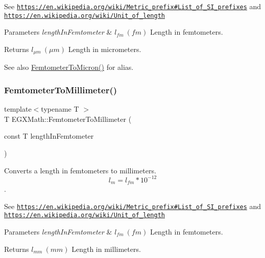 See \href{https://en.wikipedia.org/wiki/Metric_prefix#List_of_SI_prefixes}{\tt https\+://en.\+wikipedia.\+org/wiki/\+Metric\+\_\+prefix\#\+List\+\_\+of\+\_\+\+S\+I\+\_\+prefixes} and \href{https://en.wikipedia.org/wiki/Unit_of_length}{\tt https\+://en.\+wikipedia.\+org/wiki/\+Unit\+\_\+of\+\_\+length} 
\begin{DoxyParams}{Parameters}
{\em length\+In\+Femtometer} & $ l_{fm}\ (fm)$ Length in femtometers. \\
\hline
\end{DoxyParams}
\begin{DoxyReturn}{Returns}
$ l_{\mu m}\ (\mu m)$ Length in micrometers. 
\end{DoxyReturn}
\begin{DoxySeeAlso}{See also}
\mbox{\hyperlink{group___e_g_x_math-_conversions-_length_conversions-_femtometer-_non-_s_i_gac1a358bdb9bf33dec3cb847cafe1bc71}{Femtometer\+To\+Micron()}} for alias. 
\end{DoxySeeAlso}
\mbox{\label{group___e_g_x_math-_conversions-_length_conversions-_femtometer-_s_i_ga2e6d6c0aad4502554b05f677ff248bc8}} 
\subsubsection{\texorpdfstring{Femtometer\+To\+Millimeter()}{FemtometerToMillimeter()}}
{\footnotesize\ttfamily template$<$typename T $>$ \\
T E\+G\+X\+Math\+::\+Femtometer\+To\+Millimeter (\begin{DoxyParamCaption}\item[{const T}]{length\+In\+Femtometer }\end{DoxyParamCaption})}



Converts a length in femtometers to millimeters. \[ l_{m}=l_{fm} * 10^{-12} \]. 

See \href{https://en.wikipedia.org/wiki/Metric_prefix#List_of_SI_prefixes}{\tt https\+://en.\+wikipedia.\+org/wiki/\+Metric\+\_\+prefix\#\+List\+\_\+of\+\_\+\+S\+I\+\_\+prefixes} and \href{https://en.wikipedia.org/wiki/Unit_of_length}{\tt https\+://en.\+wikipedia.\+org/wiki/\+Unit\+\_\+of\+\_\+length} 
\begin{DoxyParams}{Parameters}
{\em length\+In\+Femtometer} & $ l_{fm}\ (fm)$ Length in femtometers. \\
\hline
\end{DoxyParams}
\begin{DoxyReturn}{Returns}
$ l_{mm}\ (mm)$ Length in millimeters. 
\end{DoxyReturn}
\mbox{\label{group___e_g_x_math-_conversions-_length_conversions-_femtometer-_s_i_ga61aa82ad734717567c959f0d4e840076}} 
